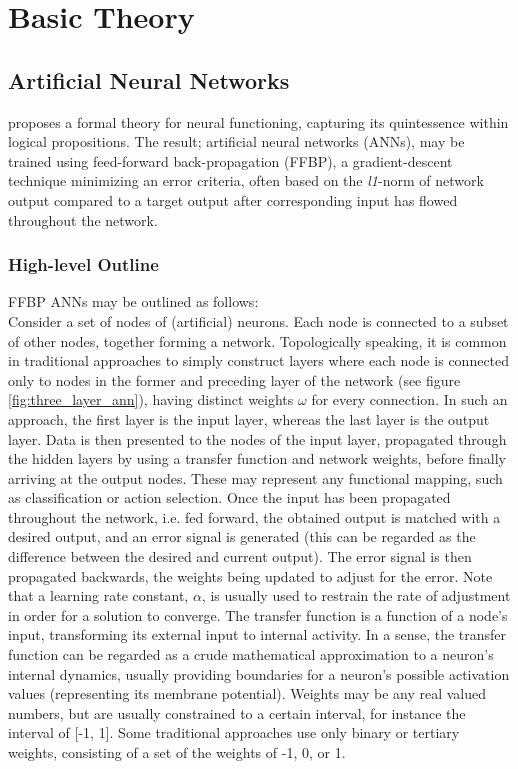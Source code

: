 
\chapter{Basic Theory}

\section{Artificial Neural Networks}

\cite{McCulloch1943} proposes a formal theory for neural functioning, capturing its quintessence within logical propositions. 
The result; artificial neural networks (ANNs), may be trained using feed-forward back-propagation (FFBP), a gradient-descent technique minimizing an error criteria, often based on the \textit{l1}-norm of network output compared to a target output after corresponding input has flowed throughout the network.

\subsection{High-level Outline}
FFBP ANNs may be outlined as follows:
\\
Consider a set of nodes of (artificial) neurons. Each node is connected to a subset of other nodes, together forming a network. Topologically speaking, it is common in traditional approaches to simply construct layers where each node is connected only to nodes in the former and preceding layer of the network (see figure \ref{fig:three_layer_ann}), having distinct weights $\omega$ for every connection. In such an approach, the first layer is the input layer, whereas the last layer is the output layer. Data is then presented to the nodes of the input layer, propagated through the hidden layers by using a transfer function and network weights, before finally arriving at the output nodes. These may represent any functional mapping, such as classification or action selection. Once the input has been propagated throughout the network, i.e. fed forward, the obtained output is matched with a desired output, and an error signal is generated (this can be regarded as the difference between the desired and current output). The error signal is then propagated backwards, the weights being updated to adjust for the error. Note that a learning rate constant, $\alpha$, is usually used to restrain the rate of adjustment in order for a solution to converge.
The transfer function is a function of a node's input, transforming its external input to internal activity. In a sense, the transfer function can be regarded as a crude mathematical approximation to a neuron's internal dynamics, usually providing boundaries for a neuron's possible activation values (representing its membrane potential). Weights may be any real valued numbers, but are usually constrained to a certain interval, for instance the interval of [-1, 1]. Some traditional approaches use only binary or tertiary weights, consisting of a set of the weights of -1, 0, or 1.


